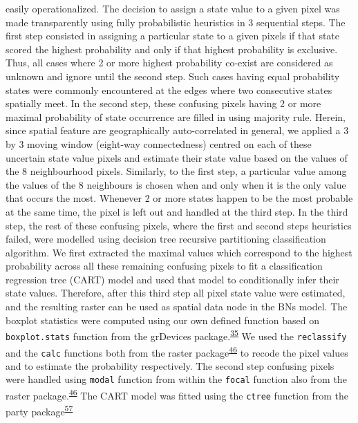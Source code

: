 \documentclass[12pt,oneside]{article}
\begin{document}
easily operationalized. The decision to assign a state value to a given
pixel was made transparently using fully probabilistic heuristics in 3
sequential steps. The first step consisted in assigning a particular
state to a given pixels if that state scored the highest probability and
only if that highest probability is exclusive. Thus, all cases where 2
or more highest probability co-exist are considered as unknown and
ignore until the second step. Such cases having equal probability states
were commonly encountered at the edges where two consecutive states
spatially meet. In the second step, these confusing pixels having 2 or
more maximal probability of state occurrence are filled in using
majority rule. Herein, since spatial feature are geographically
auto-correlated in general, we applied a 3 by 3 moving window (eight-way
connectedness) centred on each of these uncertain state value pixels and
estimate their state value based on the values of the 8 neighbourhood
pixels. Similarly, to the first step, a particular value among the
values of the 8 neighbours is chosen when and only when it is the only
value that occurs the most. Whenever 2 or more states happen to be the
most probable at the same time, the pixel is left out and handled at the
third step. In the third step, the rest of these confusing pixels, where
the first and second steps heuristics failed, were modelled using
decision tree recursive partitioning classification algorithm. We first
extracted the maximal values which correspond to the highest probability
across all these remaining confusing pixels to fit a classification
regression tree (CART) model and used that model to conditionally infer
their state values. Therefore, after this third step all pixel state
value were estimated, and the resulting raster can be used as spatial
data node in the BNs model. The boxplot statistics were computed using
our own defined function based on \texttt{boxplot.stats} function from
the grDevices
package.\textsuperscript{\protect\hyperlink{ref-RCoreTeam_2018}{35}} We
used the \texttt{reclassify} and the \texttt{calc} functions both from
the raster
package\textsuperscript{\protect\hyperlink{ref-Hijmans_2019}{46}} to
recode the pixel values and to estimate the probability respectively.
The second step confusing pixels were handled using \texttt{modal}
function from within the \texttt{focal} function also from the raster
package.\textsuperscript{\protect\hyperlink{ref-Hijmans_2019}{46}} The
CART model was fitted using the \texttt{ctree} function from the party
package\textsuperscript{\protect\hyperlink{ref-Hothorn_et_al_2006}{57}}
\end{document}
